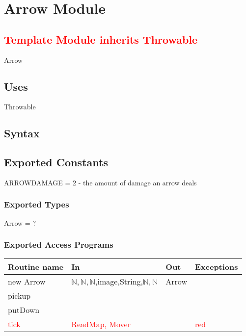 \documentclass[12pt]{article}
\begin{document}
\newpage

\section*{Arrow Module}

\subsection*{\textcolor{red}{Template Module inherits Throwable}}

Arrow

\subsection*{Uses}

Throwable

\subsection*{Syntax}

\subsection*{Exported Constants}

ARROWDAMAGE = 2 - the amount of damage an arrow deals

\subsubsection*{Exported Types}

Arrow = ?

\subsubsection*{Exported Access Programs}

\begin{tabular}{| l | l | l | l |}
\hline
\textbf{Routine name} & \textbf{In} & \textbf{Out} & \textbf{Exceptions}\\
\hline
new Arrow & $\mathbb{N}, \mathbb{N}, \mathbb{N}$,image,String,$\mathbb{N},\mathbb{N}$ & Arrow & \\
\hline
pickup & ~ & ~ & ~\\
\hline
putDown & ~ & ~ & ~\\
\hline
\textcolor{red}{tick} & \textcolor{red}{ReadMap, Mover} & \textcolor{red}{ ~} & \textcolor{red}{red}{~}\\
\hline
\end{tabular}
\end{document}

